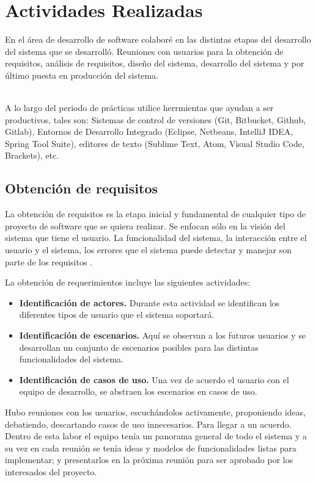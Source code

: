 \chapter{Actividades Realizadas}
	En el área de desarrollo de software colaboré en las distintas etapas del
	desarrollo del sistema que se desarrolló. Reuniones con usuarios para la
	obtención de requisitos, análisis de requisitos, diseño del sistema, desarrollo
	del sistema y por último puesta en producción del sistema.\\\
	
	A lo largo del periodo de prácticas utilice herrmientas que ayudan a ser
	productivos, tales son: Sistemas de control de versiones (Git, Bitbucket,
	Github, Gitlab), Entornos de Desarrollo Integrado (Eclipse, Netbeans, IntelliJ
	IDEA, Spring Tool Suite), editores de texto (Sublime Text, Atom, Visual Studio Code, Brackets), etc.
	
	\section{Obtención de requisitos}
		La obtención de requisitos es la etapa inicial y fundamental de cualquier tipo
		de proyecto de software que se quiera realizar. Se enfocan sólo en la visión
		del sistema que tiene el usuario. La funcionalidad del sistema, la interacción entre el
		usuario y el sistema, los errores que el sistema puede detectar y manejar son
		parte de los requisitos \cite{bernd1ingenieria}.
		
		La obtención de requerimientos incluye las siguientes actividades:
		
		\begin{itemize}
		  \item {\bf Identificación de actores.} {Durante esta actividad se
		  identifican los diferentes tipos de usuario que el sistema soportará.}
		  
		  \item {\bf Identificación de escenarios.} {Aquí se observan a los futuros
		  usuarios y se desarrollan un conjunto de escenarios posibles para las
		  distintas funcionalidades del sistema.}
		  
		  \item {\bf Identificación de casos de uso.} {Una vez de acuerdo el usuario
		  con el equipo de desarrollo, se abstraen los escenarios en casos de uso.}
		\end{itemize}
		
		Hubo reuniones con los usuarios, escuchándolos activamente, proponiendo ideas,
		debatiendo, descartando casos de uso innecesarios. Para llegar a un acuerdo.
		Dentro de esta labor el equipo tenía un panorama general de todo el sistema y a su vez
		en cada reunión se tenía ideas y modelos de funcionalidades listas para
		implementar; y presentarlos en la próxima reunión para ser aprobado por los
		interesados del proyecto.\\\
		
